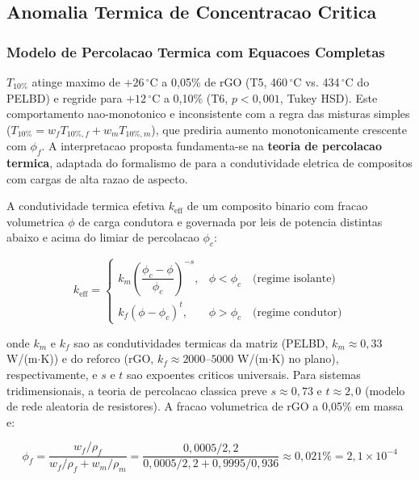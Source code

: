 \documentclass[11pt,a4paper,oneside]{article}
\begin{document}
\subsection{Anomalia Termica de Concentracao Critica}\label{sec:anomalia}

\subsubsection{Modelo de Percolacao Termica com Equacoes Completas}

$T_{10\%}$ atinge maximo de $+26\,^{\circ}$C a 0,05\% de rGO (T5, 460$\,^{\circ}$C vs. 434$\,^{\circ}$C do PELBD) e regride para $+12\,^{\circ}$C a 0,10\% (T6, $p{<}0{,}001$, Tukey HSD). Este comportamento nao-monotonico e inconsistente com a regra das misturas simples ($T_{10\%}{=}w_f T_{10\%,f}{+}w_m T_{10\%,m}$), que prediria aumento monotonicamente crescente com $\phi_f$. A interpretacao proposta fundamenta-se na {\bfseries teoria de percolacao termica}, adaptada do formalismo de \citet{Celzard1996} para a condutividade eletrica de compositos com cargas de alta razao de aspecto.

A condutividade termica efetiva $k_{\text{eff}}$ de um composito binario com fracao volumetrica $\phi$ de carga condutora e governada por leis de potencia distintas abaixo e acima do limiar de percolacao $\phi_c$:

\begin{equation}
k_{\text{eff}} = \begin{cases}
k_m\left(\dfrac{\phi_c - \phi}{\phi_c}\right)^{-s}, & \phi < \phi_c \quad\text{(regime isolante)}\\[6pt]
k_f(\phi - \phi_c)^t, & \phi > \phi_c \quad\text{(regime condutor)}
\end{cases}
\label{eq:percolacao_k}
\end{equation}

onde $k_m$ e $k_f$ sao as condutividades termicas da matriz (PELBD, $k_m{\approx}0{,}33$ W/(m$\cdot$K)) e do reforco (rGO, $k_f{\approx}2000$--$5000$ W/(m$\cdot$K) no plano), respectivamente, e $s$ e $t$ sao expoentes criticos universais. Para sistemas tridimensionais, a teoria de percolacao classica preve $s{\approx}0{,}73$ e $t{\approx}2{,}0$ (modelo de rede aleatoria de resistores). A fracao volumetrica de rGO a 0,05\% em massa e:

\begin{equation}
\phi_f = \frac{w_f/\rho_f}{w_f/\rho_f + w_m/\rho_m} = \frac{0{,}0005/2{,}2}{0{,}0005/2{,}2 + 0{,}9995/0{,}936} \approx 0{,}021\% = 2{,}1{\times}10^{-4}
\label{eq:phif}
\end{equation}
\end{document}
